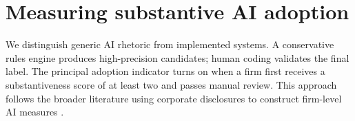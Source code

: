 \section{Measuring substantive AI adoption}
We distinguish generic AI rhetoric from implemented systems. A conservative rules engine produces high-precision candidates; human coding validates the final label. The principal adoption indicator turns on when a firm first receives a substantiveness score of at least two and passes manual review. This approach follows the broader literature using corporate disclosures to construct firm-level AI measures \citep{yu2026}.
